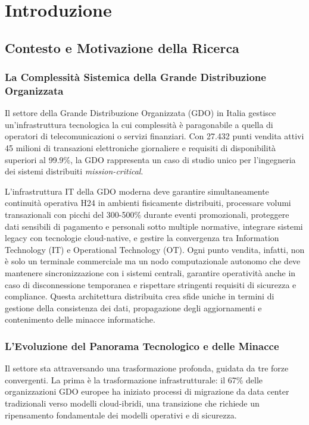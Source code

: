 \chapter{Introduzione}
\label{cap1_introduction}

\section{Contesto e Motivazione della Ricerca}

\subsection{La Complessità Sistemica della Grande Distribuzione Organizzata}

Il settore della Grande Distribuzione Organizzata (GDO) in Italia gestisce un'infrastruttura tecnologica la cui complessità è paragonabile a quella di operatori di telecomunicazioni o servizi finanziari. Con 27.432 punti vendita attivi\autocite{istat2024} 45 milioni di transazioni elettroniche giornaliere e requisiti di disponibilità superiori al 99.9\%, la GDO rappresenta un caso di studio unico per l'ingegneria dei sistemi distribuiti\textit{ mission-critical}.

L'infrastruttura IT della GDO moderna deve garantire simultaneamente continuità operativa H24 in ambienti fisicamente distribuiti, processare volumi transazionali con picchi del 300-500\% durante eventi promozionali\autocite{Osservatorio2024}, proteggere dati sensibili di pagamento e personali sotto multiple normative, integrare sistemi legacy con tecnologie cloud-native, e gestire la convergenza tra Information Technology (IT) e Operational Technology (OT). Ogni punto vendita, infatti, non è solo un terminale commerciale ma un nodo computazionale autonomo che deve mantenere sincronizzazione con i sistemi centrali, garantire operatività anche in caso di disconnessione temporanea e rispettare stringenti requisiti di sicurezza e compliance. Questa architettura distribuita crea sfide uniche in termini di gestione della consistenza dei dati, propagazione degli aggiornamenti e contenimento delle minacce informatiche.

\subsection{L'Evoluzione del Panorama Tecnologico e delle Minacce}

Il settore sta attraversando una trasformazione profonda, guidata da tre forze convergenti. La prima è la trasformazione infrastrutturale: il 67\% delle organizzazioni GDO europee ha iniziato processi di migrazione da data center tradizionali verso modelli cloud-ibridi\autocite{gartner2024cloud}, una transizione che richiede un ripensamento fondamentale dei modelli operativi e di sicurezza.

